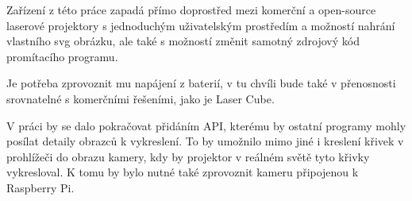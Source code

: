 Zařízení z této práce zapadá přímo doprostřed mezi komerční a open-source laserové projektory s jednoduchým uživatelským prostředím a možností nahrání vlastního svg obrázku, ale také s možností změnit samotný zdrojový kód promítacího programu.

Je potřeba zprovoznit mu napájení z baterií, v tu chvíli bude také v přenosnosti srovnatelné s komerčními řešeními, jako je Laser Cube.

V práci by se dalo pokračovat přidáním API, kterému by ostatní programy mohly posílat detaily obrazců k vykreslení. To by umožnilo mimo jiné i kreslení křivek v prohlížeči do obrazu kamery, kdy by projektor v reálném světě tyto křivky vykresloval. K tomu by bylo nutné také zprovoznit kameru připojenou k Raspberry Pi.
